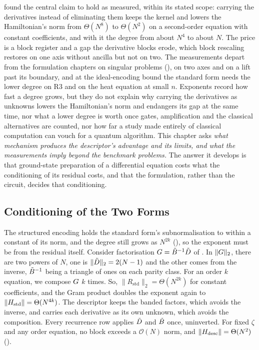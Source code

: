  found the central claim to hold as measured, within its stated scope: carrying the derivatives instead of eliminating them keeps the kernel and lowers the Hamiltonian's norm from $\Theta(N^8)$ to $\Theta(N^2)$ on a second-order equation with constant coefficients, and with it the degree from about $N^4$ to about $N$. The price is a block register and a gap the derivative blocks erode, which block rescaling restores on one axis without ancilla but not on two. The measurements depart from the formulation chapters on singular problems (), on two axes and on a lift past its boundary, and at the ideal-encoding bound the standard form needs the lower degree on R3 and on the heat equation at small $n$. Exponents record how fast a degree grows, but they do not explain why carrying the derivatives as unknowns lowers the Hamiltonian's norm and endangers its gap at the same time, nor what a lower degree is worth once gates, amplification and the classical alternatives are counted, nor how far a study made entirely of classical computation can vouch for a quantum algorithm. This chapter asks \emph{what mechanism produces the descriptor's advantage and its limits, and what the measurements imply beyond the benchmark problems.} The answer it develops is that ground-state preparation of a differential equation costs what the conditioning of its residual costs, and that the formulation, rather than the circuit, decides that conditioning.

\subsection{Conditioning of the Two Forms}
\label{sec:disc-tradeoff}

The structured encoding holds the standard form's subnormalisation to within a constant of its norm, and the degree still grows as $N^{2k}$ (), so the exponent must be from the residual itself. Consider factorisation $G=\tilde{B}^{-1}\tilde{D}$ of . In $\|G\|_2$, there are two powers of $N$, one is $\|\tilde{D}\|_2=2(N-1)$ and the other comes from the inverse, $\tilde{B}^{-1}$ being a triangle of ones on each parity class. For an order $k$ equation, we compose $G$ $k$ times. So, $\|R_{\mathrm{std}}\|_2=\Theta(N^{2k})$ for constant coefficients, and the Gram product doubles the exponent again to $\|H_{\mathrm{std}}\|=\Theta(N^{4k})$. The descriptor keeps the banded factors, which avoids the inverse, and carries each derivative as its own unknown, which avoids the composition. Every recurrence row applies $\tilde{D}$ and $\tilde{B}$ once, uninverted. For fixed $\zeta$ and any order equation, no block exceeds a $\mathcal O(N)$ norm, and $\|H_{\mathrm{desc}}\|=\Theta(N^2)$ ().

